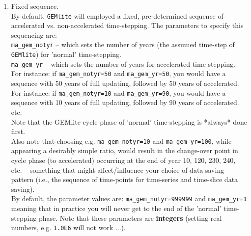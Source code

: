 \documentclass[11pt,fleqn]{book} %
\begin{document}
\begin{enumerate}

\vspace{1mm}
        \item Fixed sequence.
        \\By default, \texttt{GEMlite} will employed a fixed, pre-determined sequence of accelerated vs. non-accelerated time-stepping. The parameters to specify this sequencing are:
        \\\texttt{ma\_gem\_notyr} -- which sets the number of years (the assumed time-step of \texttt{GEMlite}) for 'normal' time-stepping.
        \\\texttt{ma\_gem\_yr} -- which sets the number of years for accelerated time-stepping.
\\For instance: if \texttt{ma\_gem\_notyr=50} and \texttt{ma\_gem\_yr=50}, you would have a sequence with 50 years of full updating, followed by 50 years of accelerated.
\\For instance: if \texttt{ma\_gem\_notyr=10} and \texttt{ma\_gem\_yr=90}, you would have a sequence with 10 years of full updating, followed by 90 years of accelerated.
\\etc.
\\Note that the GEMlite cycle phase of 'normal' time-stepping is *always* done first.
\\Also note that choosing e.g. \texttt{ma\_gem\_notyr=10} and \texttt{ma\_gem\_yr=100}, while appearing a desirably simple ratio, would result in the change-over point in cycle phase (to accelerated) occurring at the end of year 10, 120, 230, 240, etc. -- something that might affect/influence your choice of data saving pattern (i.e., the sequence of time-points for time-series and time-slice data saving).
\\By default, the parameter values are: \texttt{ma\_gem\_notyr=999999} and \texttt{ma\_gem\_yr=1} meaning that in practice you will never get to the end of the 'normal' time-stepping phase. Note that these parameters are \textbf{integers} (setting real numbers, e.g. \texttt{1.0E6} will not work ...).


\end{enumerate}
\end{document}
